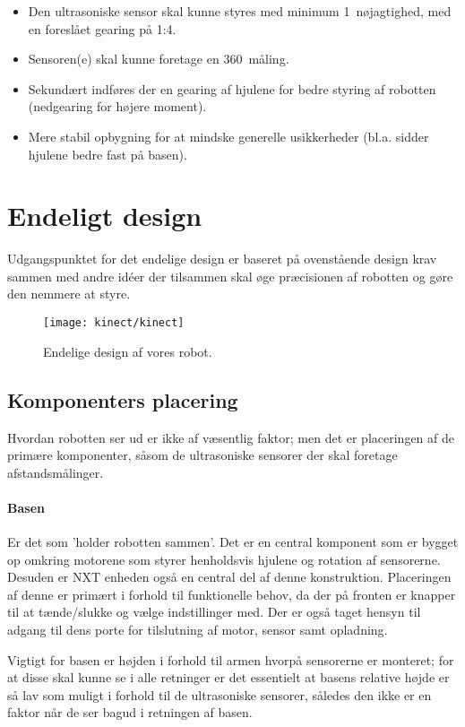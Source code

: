 \begin{itemize}
\item Den ultrasoniske sensor skal kunne styres med  minimum 1\degree~nøjagtighed, med en foreslået gearing på 1:4.
\item Sensoren(e) skal kunne foretage en 360\degree~måling.
\item Sekundært indføres der en gearing af hjulene for bedre styring af robotten (nedgearing for højere moment).
\item Mere stabil opbygning for at mindske generelle usikkerheder (bl.a. sidder hjulene bedre fast på basen).
\end{itemize} 


\section{Endeligt design}
Udgangspunktet for det endelige design er baseret på ovenstående design krav sammen med andre idéer der tilsammen skal øge præcisionen af robotten og gøre den nemmere at styre.

\begin{figure}
\centering
\texttt{[image: kinect/kinect]}
\caption{Endelige design af vores robot.}
\label{robot:opbygning}
\end{figure}

\subsection{Komponenters placering}
Hvordan robotten ser ud er ikke af væsentlig faktor; men det er placeringen af de primære komponenter, såsom de ultrasoniske sensorer der skal foretage afstandsmålinger.


\paragraph{Basen}
Er det som 'holder robotten sammen'.
Det er en central komponent som er bygget op omkring motorene som styrer henholdsvis hjulene og rotation af sensorerne.
Desuden er NXT enheden også en central del af denne konstruktion.
Placeringen af denne er primært i forhold til funktionelle behov, da der på fronten er knapper til at tænde/slukke og vælge indstillinger med.
Der er også taget hensyn til adgang til dens porte for tilslutning af motor, sensor samt opladning.

Vigtigt for basen er højden i forhold til armen hvorpå sensorerne er monteret; for at disse skal kunne se i alle retninger er det essentielt at basens relative højde er så lav som muligt i forhold til de ultrasoniske sensorer, således den ikke er en faktor når de ser bagud i retningen af basen. 

